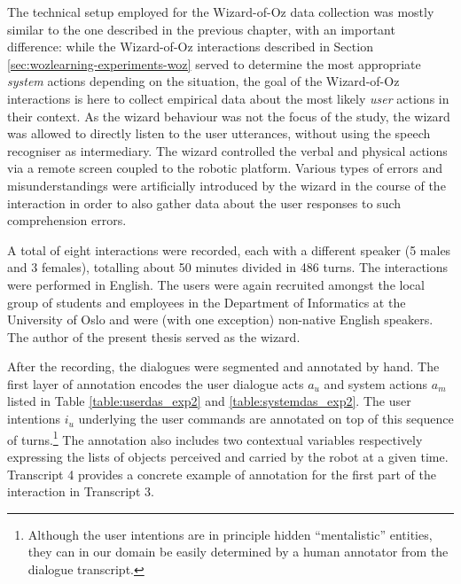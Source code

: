 The technical setup employed for the Wizard-of-Oz data collection was mostly similar to the one described in the previous chapter, with an important difference:  while the Wizard-of-Oz interactions described in Section \ref{sec:wozlearning-experiments-woz} served to determine the most appropriate \textit{system} actions depending on the situation, the goal of the Wizard-of-Oz interactions is here to collect empirical data about the most likely \textit{user} actions in their context.  As the wizard behaviour was not the focus of the study, the wizard was allowed to directly listen to the user utterances, without using the speech recogniser as intermediary. The wizard controlled the verbal and physical actions via a remote screen coupled to the robotic platform. Various types of errors and misunderstandings were artificially introduced by the wizard in the course of the interaction in order to also gather data about the user responses to such comprehension errors. 

A total of eight interactions were recorded, each with a different speaker (5 males and 3 females), totalling about 50 minutes divided in 486 turns.  The interactions were performed in English. The users were again recruited amongst the local group of students and employees in the Department of Informatics at the University of Oslo and were (with one exception) non-native English speakers. The author of the present thesis served as the wizard. 

After the recording, the dialogues were segmented and annotated by hand. The first layer of annotation encodes the user dialogue acts $a_u$ and system actions $a_m$ listed in Table \ref{table:userdas_exp2} and \ref{table:systemdas_exp2}. The user intentions $i_u$ underlying the user commands are annotated on top of this sequence of turns.\footnote{Although the user intentions are in principle hidden ``mentalistic'' entities, they can in our domain be easily determined by a human annotator from the dialogue transcript.} The annotation also includes two contextual variables respectively expressing the lists of objects perceived and carried by the robot at a given time. Transcript 4 provides a concrete example of annotation for the first part of the interaction in Transcript 3. 

